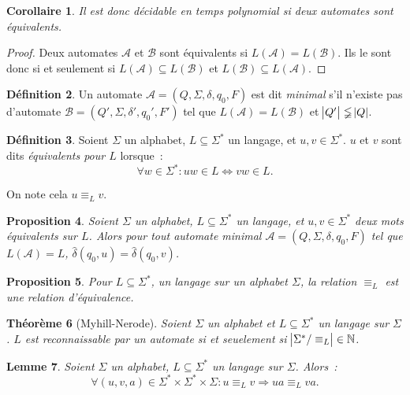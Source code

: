 \documentclass{article}
\newtheorem{thm}{Théorème}[section]
\newtheorem{prp}[thm]{Proposition}
\newtheorem{cor}[thm]{Corollaire}
\newtheorem{lem}[thm]{Lemme}
\theoremstyle{definition}
\newtheorem{déf}[thm]{Définition}
\theoremstyle{remark}
\newcommand{\N}{\mathbb N}
\newcommand{\automaton}{(Q, \Sigma, \delta, q_0, F)}
\begin{document}
	\begin{cor} Il est donc décidable en temps polynomial si deux automates sont équivalents.
	\end{cor}

	\begin{proof} Deux automates $\mathcal A$ et $\mathcal B$ sont équivalents si $L(\mathcal A) = L(\mathcal B)$. Ils le sont donc si et seulement si
	$L(\mathcal A) \subseteq L(\mathcal B)$ et $L(\mathcal B) \subseteq L(\mathcal A)$.
	\end{proof}

	\begin{déf} Un automate $\mathcal A = \automaton$ est dit \textit{minimal} s'il n'existe pas d'automate $\mathcal B = (Q', \Sigma, \delta', q_0', F')$
	tel que $L(\mathcal A) = L(\mathcal B)$ et $\abs {Q'} \lneqq \abs Q$.
	\end{déf}

	\begin{déf} Soient $\Sigma$ un alphabet, $L \subseteq \Sigma^*$ un langage, et $u, v \in \Sigma^*$. $u$ et $v$ sont dits \textit{équivalents pour $L$}
	lorsque~:
	\[\forall w \in \Sigma^* : uw \in L \iff vw \in L.\]

	On note cela $u \equiv_L v$.
	\end{déf}

	\begin{prp} Soient $\Sigma$ un alphabet, $L \subseteq \Sigma^*$ un langage, et $u, v \in \Sigma^*$ deux mots équivalents sur $L$.
	Alors pour tout automate minimal $\mathcal A = \automaton$ tel que $L(\mathcal A) = L$, $\hat \delta(q_0, u) = \hat \delta(q_0, v)$.
	\end{prp}

	\begin{prp} Pour $L \subseteq \Sigma^*$, un langage sur un alphabet $\Sigma$, la relation $\equiv_L$ est une relation d'équivalence.
	\end{prp}

	\begin{thm}[Myhill-Nerode] Soient $\Sigma$ un alphabet et $L \subseteq \Sigma^*$ un langage sur $\Sigma$. $L$ est reconnaissable par un automate si et
	seuelement si $\abs {\Sigma^* / \equiv_L} \in \N$.
	\end{thm}

	\begin{lem}\label{lem:mots équivalents -> concaténations équivalentes} Soient $\Sigma$ un alphabet, $L \subseteq \Sigma^*$ un langage sur $\Sigma$. Alors~:
	\[\forall (u, v, a) \in \Sigma^* \times \Sigma^* \times \Sigma : u \equiv_L v \Rightarrow ua \equiv_L va.\]
	\end{lem}
\end{document}
